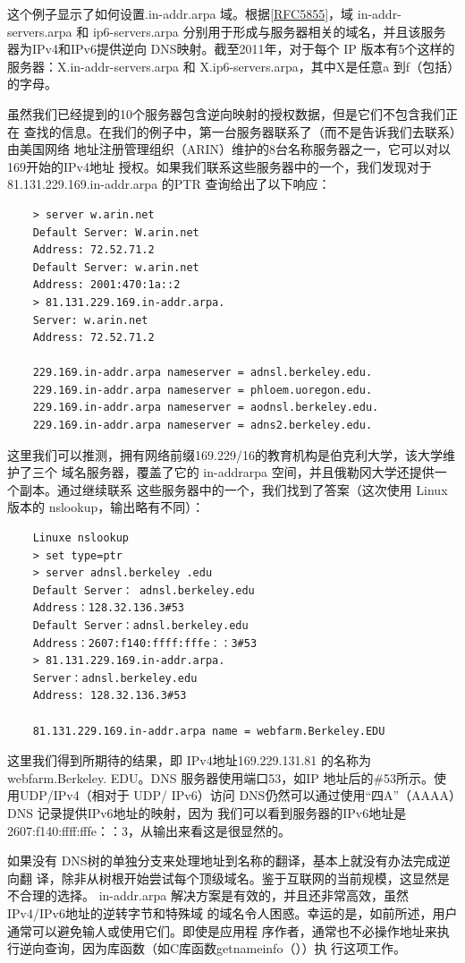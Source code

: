 这个例子显示了如何设置.in-addr.arpa 域。根据\href{https://www.rfc-editor.org/rfc/rfc5855}{[RFC5855]}，域 in-addr-servers.arpa 和
ip6-servers.arpa 分别用于形成与服务器相关的域名，并且该服务器为IPv4和IPv6提供逆向
DNS映射。截至2011年，对于每个 IP 版本有5个这样的服务器：X.in-addr-servers.arpa 和
X.ip6-servers.arpa，其中X是任意a 到f（包括）的字母。

虽然我们已经提到的10个服务器包含逆向映射的授权数据，但是它们不包含我们正在
查找的信息。在我们的例子中，第一台服务器联系了（而不是告诉我们去联系）由美国网络
地址注册管理组织（ARIN）维护的8台名称服务器之一，它可以对以 169开始的IPv4地址
授权。如果我们联系这些服务器中的一个，我们发现对于81.131.229.169.in-addr.arpa 的PTR
查询给出了以下响应：
\begin{verbatim} 
    > server w.arin.net
    Default Server: W.arin.net
    Address: 72.52.71.2
    Default Server: w.arin.net
    Address: 2001:470:1a::2
    > 81.131.229.169.in-addr.arpa.
    Server: w.arin.net
    Address: 72.52.71.2

    229.169.in-addr.arpa nameserver = adnsl.berkeley.edu.
    229.169.in-addr.arpa nameserver = phloem.uoregon.edu.
    229.169.in-addr.arpa nameserver = aodnsl.berkeley.edu.
    229.169.in-addr.arpa nameserver = adns2.berkeley.edu.
\end{verbatim}

这里我们可以推测，拥有网络前缀169.229/16的教育机构是伯克利大学，该大学维护了三个
域名服务器，覆盖了它的 in-addrarpa 空间，并且俄勒冈大学还提供一个副本。通过继续联系
这些服务器中的一个，我们找到了答案（这次使用 Linux版本的 nslookup，输出略有不同）：

\begin{verbatim}
    Linuxe nslookup
    > set type=ptr
    > server adnsl.berkeley .edu
    Default Server： adnsl.berkeley.edu
    Address：128.32.136.3#53
    Default Server：adnsl.berkeley.edu
    Address：2607:f140:ffff:fffe：：3#53
    > 81.131.229.169.in-addr.arpa.
    Server：adnsl.berkeley.edu
    Address: 128.32.136.3#53

    81.131.229.169.in-addr.arpa name = webfarm.Berkeley.EDU
\end{verbatim}

这里我们得到所期待的结果，即 IPv4地址169.229.131.81 的名称为 webfarm.Berkeley.
EDU。DNS 服务器使用端口53，如IP 地址后的\#53所示。使用UDP/IPv4（相对于 UDP/
IPv6）访问 DNS仍然可以通过使用“四A”（AAAA）DNS 记录提供IPv6地址的映射，因为
我们可以看到服务器的IPv6地址是 2607:f140:ffff:fffe：：3，从输出来看这是很显然的。

如果没有 DNS树的单独分支来处理地址到名称的翻译，基本上就没有办法完成逆向翻
译，除非从树根开始尝试每个顶级域名。鉴于互联网的当前规模，这显然是不合理的选择。
in-addr.arpa 解决方案是有效的，并且还非常高效，虽然IPv4/IPv6地址的逆转字节和特殊域
的域名令人困惑。幸运的是，如前所述，用户通常可以避免输人或使用它们。即使是应用程
序作者，通常也不必操作地址来执行逆向查询，因为库函数（如C库函数getnameinfo（））执
行这项工作。

